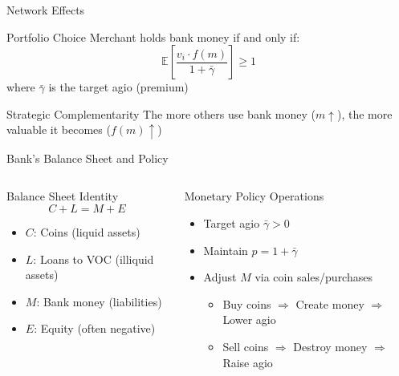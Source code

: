 \documentclass[aspectratio=169, xcolor=table]{beamer}
\begin{document}
\begin{frame}{Network Effects}

  \begin{block}{Portfolio Choice}
    Merchant holds bank money if and only if:
    \[
      \mathbb{E} \left[ \frac{v_i \cdot f(m)}{1 + \bar{\gamma}} \right] \geq 1
    \]
    where $\bar{\gamma}$ is the target agio (premium)
  \end{block}

  \begin{alertblock}{Strategic Complementarity}
    The more others use bank money ($m \uparrow$), the more valuable it becomes ($f(m) \uparrow$)
  \end{alertblock}
\end{frame}

\begin{frame}{Bank's Balance Sheet and Policy}
  \begin{columns}
    \begin{column}{0.5\textwidth}
      \begin{block}{Balance Sheet Identity}
        \[
          C + L = M + E
        \]
        \begin{itemize}
          \item $C$: Coins (liquid assets)
          \item $L$: Loans to VOC (illiquid assets)
          \item $M$: Bank money (liabilities)
          \item $E$: Equity (often negative)
        \end{itemize}
      \end{block}
    \end{column}
    \begin{column}{0.5\textwidth}
      \begin{block}{Monetary Policy Operations}
        \begin{itemize}
          \item Target agio $\bar{\gamma} > 0$
          \item Maintain $p = 1 + \bar{\gamma}$
          \item Adjust $M$ via coin sales/purchases
                \begin{itemize}
                  \item Buy coins $\Rightarrow$ Create money $\Rightarrow$ Lower agio
                  \item Sell coins $\Rightarrow$ Destroy money $\Rightarrow$ Raise agio
                \end{itemize}
        \end{itemize}
      \end{block}
    \end{column}
  \end{columns}
\end{frame}
\end{document}
